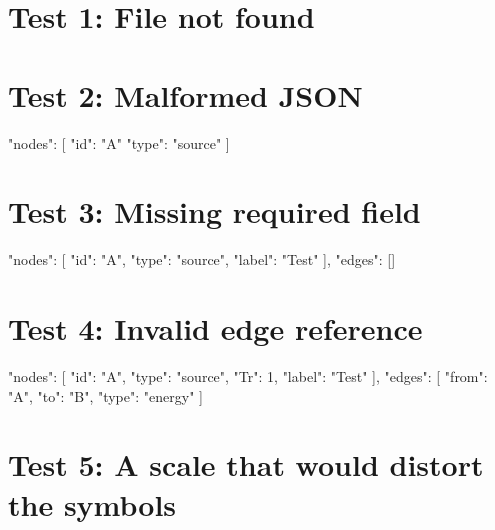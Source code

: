 \documentclass{article}
\begin{document}
\section{Test 1: File not found}

\section{Test 2: Malformed JSON}
\begin{energeseData}
{
  "nodes": [
    {"id": "A" "type": "source"}  %
  ]
}
\end{energeseData}

\section{Test 3: Missing required field}
\begin{energeseData}
{
  "nodes": [
    {"id": "A", "type": "source", "label": "Test"}
  ],
  "edges": []
}
\end{energeseData}

\section{Test 4: Invalid edge reference}
\begin{energeseData}
{
  "nodes": [
    {"id": "A", "type": "source", "Tr": 1, "label": "Test"}
  ],
  "edges": [
    {"from": "A", "to": "B", "type": "energy"}
  ]
}
\end{energeseData}

\section{Test 5: A scale that would distort the symbols}
\end{document}

